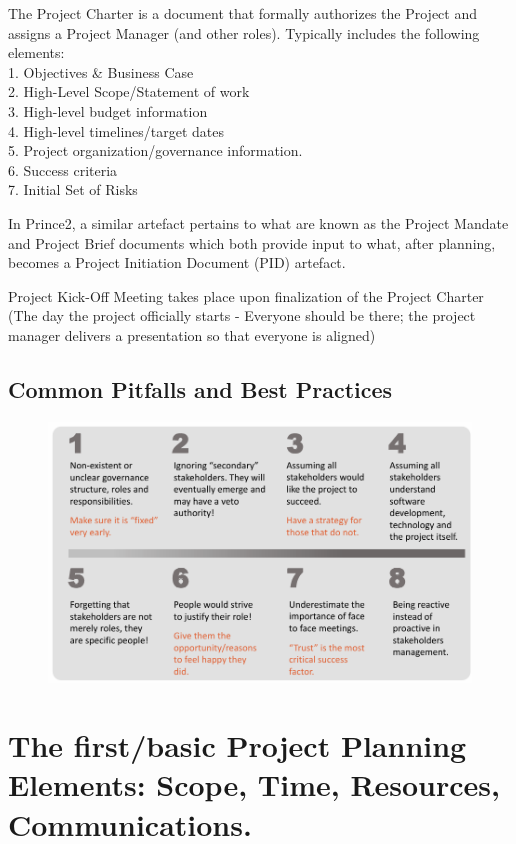 \documentclass[]{project_plan}
\begin{document}
The Project Charter is a document that formally authorizes the Project and
assigns a Project Manager (and other roles). Typically includes the following
elements:\\
1. Objectives \& Business Case\\
2. High-Level Scope/Statement of work\\
3. High-level budget information\\
4. High-level timelines/target dates\\
5. Project organization/governance information.\\
6. Success criteria\\
7. Initial Set of Risks

In Prince2, a similar artefact pertains to what are known as the Project
Mandate and Project Brief documents which both provide input to what,
after planning, becomes a Project Initiation Document (PID) artefact.

Project Kick-Off Meeting takes place upon finalization of the Project Charter (The day the project officially starts - Everyone should be there; the project manager delivers a presentation so that everyone is aligned)

\section{Common Pitfalls and Best Practices}
\begin{figure}[h!]
  \centering
  \includegraphics[width=\linewidth]{project_initiation_common_pitfalls.png}
\end{figure}


\chapter{The first/basic Project Planning Elements: Scope, Time, Resources, Communications.}
\end{document}
